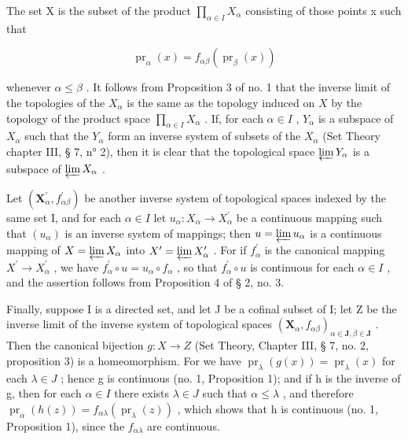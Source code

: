 The set X is the subset of the product \(\prod_{\alpha\in I}X_{\alpha}\) consisting of those points x such that

\[
\operatorname{pr} _ {\alpha} (x) = f _ {\alpha \beta} (\operatorname{pr} _ {\beta} (x))\tag{I}
\]

whenever \(\alpha \leqslant \beta\) . It follows from Proposition 3 of no. 1 that the inverse limit of the topologies of the \(X_{\alpha}\) is the same as the topology induced on \(X\) by the topology of the product space \(\prod_{\alpha \in I} X_{\alpha}\) . If, for each \(\alpha \in I\) , \(Y_{\alpha}\) is a subspace of \(X_{\alpha}\) such that the \(Y_{\alpha}\) form an inverse system of subsets of the \(X_{\alpha}\) (Set Theory chapter III, § 7, n° 2), then it is clear that the topological space \(\varprojlim Y_{\alpha}\) is a subspace of \(\varprojlim X_{\alpha}\) .

Let \((\mathbf{X}_{\alpha}^{\prime}, f_{\alpha\beta}^{\prime})\) be another inverse system of topological spaces indexed by the same set I, and for each \(\alpha \in I\) let \(u_{\alpha}: X_{\alpha} \to X_{\alpha}^{\prime}\) be a continuous mapping such that \((u_{\alpha})\) is an inverse system of mappings; then \(u = \varprojlim u_{\alpha}\) is a continuous mapping of \(X = \varprojlim X_{\alpha}\) into \(X^{\prime} = \varprojlim X_{\alpha}^{\prime}\) . For if \(f_{\alpha}^{\prime}\) is the canonical mapping \(X^{\prime} \to X_{\alpha}^{\prime}\) , we have \(f_{\alpha}^{\prime} \circ u = u_{\alpha} \circ f_{\alpha}\) , so that \(f_{\alpha}^{\prime} \circ u\) is continuous for each \(\alpha \in I\) , and the assertion follows from Proposition 4 of § 2, no. 3.

Finally, suppose I is a directed set, and let J be a cofinal subset of I; let Z be the inverse limit of the inverse system of topological spaces \((\mathbf{X}_{\alpha}, f_{\alpha\beta})_{\alpha\in\mathbf{J}, \beta\in\mathbf{J}}\) . Then the canonical bijection \(g: X \to Z\) (Set Theory, Chapter III, § 7, no. 2, proposition 3) is a homeomorphism. For we have \(\operatorname{pr}_{\lambda}(g(x)) = \operatorname{pr}_{\lambda}(x)\) for each \(\lambda \in J\) ; hence g is continuous (no. 1, Proposition 1); and if h is the inverse of g, then for each \(\alpha \in I\) there exists \(\lambda \in J\) such that \(\alpha \leqslant \lambda\) , and therefore \(\operatorname{pr}_{\alpha}(h(z)) = f_{\alpha\lambda}(\operatorname{pr}_{\lambda}(z))\) , which shows that h is continuous (no. 1, Proposition 1), since the \(f_{\alpha\lambda}\) are continuous.

